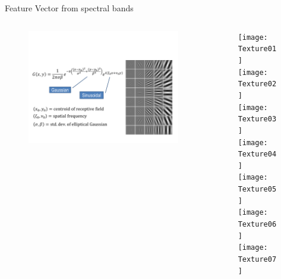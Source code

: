 
\begin{frame}{Feature Vector from spectral bands}
\begin{columns}
\begin{column}{3.5cm}
\begin{figure}
\includegraphics[scale=0.47]{Figures/FE011}
\end{figure}
\end{column}
\begin{column}{7cm}
\begin{figure}
\texttt{[image: Texture01]}\\
\texttt{[image: Texture02]}~~
\texttt{[image: Texture03]}~~
\texttt{[image: Texture04]}\\
\texttt{[image: Texture05]}~~
\texttt{[image: Texture06]}~~
\texttt{[image: Texture07]}
\end{figure}
\end{column}
\end{columns}

\end{frame}

